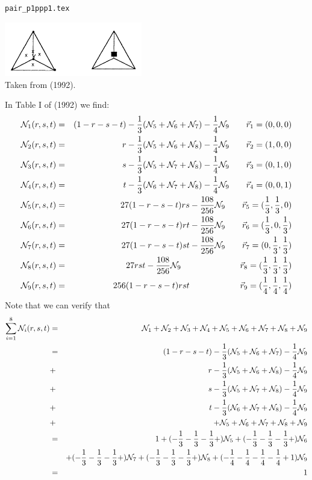 \begin{flushright} {\tiny {\color{gray} \tt pair\_p1ppp1.tex}} \end{flushright}


\begin{center}
\includegraphics[width=6cm]{images/pair_p1ppp1/p1ppp1}\\
{\captionfont Taken from \textcite{begt92} (1992).}
\end{center}

In Table I of \textcite{begt92} (1992) we find:
\begin{eqnarray}
{\mathcal{N}}_1(r,s,t) &=& (1-r-s-t)-\frac13 ({\mathcal{N}}_5+{\mathcal{N}}_6+{\mathcal{N}}_7)-\frac14 {\mathcal{N}}_9 \qquad \vec{r}_1=(0,0,0) \nonumber\\
{\mathcal{N}}_2(r,s,t) &=& r-\frac13 ({\mathcal{N}}_5+{\mathcal{N}}_6+{\mathcal{N}}_8)-\frac14 {\mathcal{N}}_9 \qquad \vec{r}_2=(1,0,0) \nonumber\\
{\mathcal{N}}_3(r,s,t) &=& s-\frac13 ({\mathcal{N}}_5+{\mathcal{N}}_7+{\mathcal{N}}_8)-\frac14 {\mathcal{N}}_9 \qquad \vec{r}_3=(0,1,0) \nonumber\\
{\mathcal{N}}_4(r,s,t) &=& t-\frac13 ({\mathcal{N}}_6+{\mathcal{N}}_7+{\mathcal{N}}_8)-\frac14 {\mathcal{N}}_9 \qquad \vec{r}_4=(0,0,1) \nonumber\\
{\mathcal{N}}_5(r,s,t) &=& 27(1-r-s-t)rs-\frac{108}{256}{\mathcal{N}}_9          \qquad \vec{r}_5=(\frac13,\frac13,0) \nonumber\\
{\mathcal{N}}_6(r,s,t) &=& 27(1-r-s-t)rt-\frac{108}{256}{\mathcal{N}}_9          \qquad \vec{r}_6=(\frac13,0,\frac13) \nonumber\\
{\mathcal{N}}_7(r,s,t) &=& 27(1-r-s-t)st-\frac{108}{256}{\mathcal{N}}_9          \qquad \vec{r}_7=(0,\frac13,\frac13) \nonumber\\
{\mathcal{N}}_8(r,s,t) &=& 27rst-\frac{108}{256}{\mathcal{N}}_9  \qquad\qquad\qquad\quad \vec{r}_8=(\frac13,\frac13,\frac13)\nonumber\\ 
{\mathcal{N}}_9(r,s,t) &=& 256(1-r-s-t)rst \qquad\qquad\qquad \vec{r}_9=(\frac14,\frac14,\frac14)\nonumber
\end{eqnarray}
Note that we can verify that
\begin{eqnarray}
\sum_{i=1}^8 {\mathcal{N}}_i(r,s,t) 
&=& {\mathcal{N}}_1 +{\mathcal{N}}_2 +{\mathcal{N}}_3 +{\mathcal{N}}_4 +{\mathcal{N}}_5 +{\mathcal{N}}_6 +{\mathcal{N}}_7 +{\mathcal{N}}_8 +{\mathcal{N}}_9\nonumber\\
&=& (1-r-s-t)-\frac13 ({\mathcal{N}}_5+{\mathcal{N}}_6+{\mathcal{N}}_7)-\frac14 {\mathcal{N}}_9 \nonumber\\
&+& r-\frac13 ({\mathcal{N}}_5+{\mathcal{N}}_6+{\mathcal{N}}_8)-\frac14 {\mathcal{N}}_9 \nonumber\\
&+& s-\frac13 ({\mathcal{N}}_5+{\mathcal{N}}_7+{\mathcal{N}}_8)-\frac14 {\mathcal{N}}_9 \nonumber\\
&+& t-\frac13 ({\mathcal{N}}_6+{\mathcal{N}}_7+{\mathcal{N}}_8)-\frac14 {\mathcal{N}}_9 \nonumber\\
&+& +{\mathcal{N}}_5 +{\mathcal{N}}_6 +{\mathcal{N}}_7 +{\mathcal{N}}_8 +{\mathcal{N}}_9 \nonumber\\
&=& 1 
+ (-\frac13-\frac13-\frac13 + )  {\mathcal{N}}_5
+ (-\frac13-\frac13-\frac13 + )  {\mathcal{N}}_6 \nonumber\\
&& + (-\frac13-\frac13-\frac13 + )  {\mathcal{N}}_7
+ (-\frac13-\frac13-\frac13 + )  {\mathcal{N}}_8 
+ (-\frac14 -\frac14-\frac14 -\frac14 +1) {\mathcal{N}}_9 \nonumber\\
&=& 1
\end{eqnarray}



